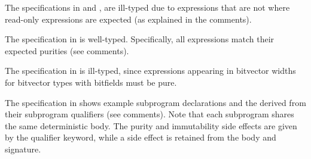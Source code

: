 The specifications in
 and
,
are ill-typed due to expressions that are not \readonlyterm{}
where read-only expressions are expected (as explained in the comments).



The specification in  is well-typed.
Specifically, all expressions match their expected purities (see comments).

The specification in  is ill-typed, since expressions
appearing in bitvector widths for bitvector types with bitfields must be pure.



The specification in  shows example subprogram declarations and the \sideeffectdescriptorsterm{} derived from their subprogram qualifiers (see comments).
Note that each subprogram shares the same deterministic body. The purity and immutability side effects are given by the qualifier keyword, while a \NonDeterministic{} side effect is retained from the body and signature.


